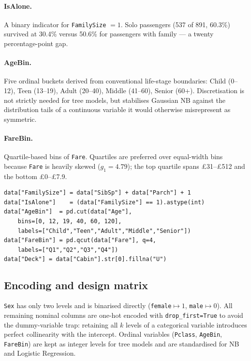 \documentclass[10pt,a4paper,twocolumn]{article}
\begin{document}
\paragraph{IsAlone.} A binary indicator for \texttt{FamilySize} $= 1$. Solo
passengers (537 of 891, 60.3\%) survived at 30.4\% versus 50.6\% for passengers with
family --- a twenty percentage-point gap.

\paragraph{AgeBin.} Five ordinal buckets derived from conventional life-stage
boundaries: Child (0--12), Teen (13--19), Adult (20--40), Middle (41--60), Senior
(60+). Discretisation is not strictly needed for tree models, but stabilises Gaussian
NB against the distribution tails of a continuous variable it would otherwise
misrepresent as symmetric.

\paragraph{FareBin.} Quartile-based bins of \texttt{Fare}. Quartiles are preferred
over equal-width bins because \texttt{Fare} is heavily skewed ($g_1 = 4.79$); the
top quartile spans £31--£512 and the bottom £0--£7.9.

\begin{lstlisting}[caption={Remaining derived features.},label={lst:derived}]
data["FamilySize"] = data["SibSp"] + data["Parch"] + 1
data["IsAlone"]    = (data["FamilySize"] == 1).astype(int)
data["AgeBin"]  = pd.cut(data["Age"],
    bins=[0, 12, 19, 40, 60, 120],
    labels=["Child","Teen","Adult","Middle","Senior"])
data["FareBin"] = pd.qcut(data["Fare"], q=4,
    labels=["Q1","Q2","Q3","Q4"])
data["Deck"] = data["Cabin"].str[0].fillna("U")
\end{lstlisting}

\subsection{Encoding and design matrix}
\texttt{Sex} has only two levels and is binarised directly
(\texttt{female}$\mapsto 1$, \texttt{male}$\mapsto 0$). All remaining nominal columns
are one-hot encoded with \texttt{drop\_first=True} to avoid the dummy-variable trap:
retaining all $k$ levels of a categorical variable introduces perfect collinearity
with the intercept. Ordinal variables (\texttt{Pclass}, \texttt{AgeBin},
\texttt{FareBin}) are kept as integer levels for tree models and are standardised
for NB and Logistic Regression.
\end{document}

